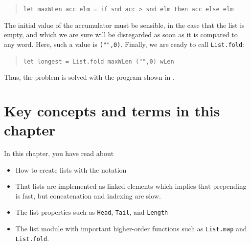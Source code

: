 \documentclass[fsharpNotes.tex]{subfiles}
\begin{document}
\begin{quote}
  \lstinline{let maxWLen acc elm = if snd acc > snd elm then acc else elm}
\end{quote}
The initial value of the accumulator must be sensible, in the case that the list is empty, and which we are sure will be disregarded as soon as it is compared to any word. Here, such a value is \lstinline{("",0)}. Finally, we are ready to call \lstinline{List.fold}:
\begin{quote}
  \lstinline{let longest = List.fold maxWLen ("",0) wLen}
\end{quote}
Thus, the problem is solved with the program shown in .
%
%

\section{Key concepts and terms in this chapter}
In this chapter, you have read about
\begin{itemize}
\item How to create lists with the \lexeme{[]} notation
\item That lists are implemented as linked elements which implies that prepending is fast, but concatenation and indexing are slow.
\item The list properties such as \lstinline{Head}, \lstinline{Tail}, and \lstinline{Length}
\item The list module with important higher-order functions such as \lstinline{List.map} and \lstinline{List.fold}.
\end{itemize}
\end{document}
